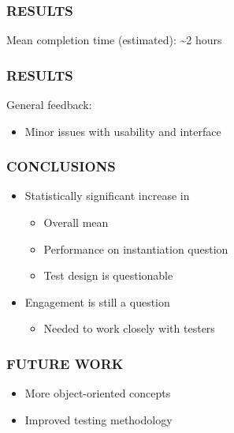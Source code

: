 \documentclass{beamer}
\let\theframetitle\frametitle
\renewcommand\frametitle[1]{\theframetitle{\MakeUppercase{#1}}}
\begin{document}
\begin{frame}
\frametitle{Results}

\begin{figure}
  \centering
\end{figure}

Mean completion time (estimated): \textasciitilde{}2 hours
\end{frame}

\begin{frame}
\frametitle{Results}
General feedback:
\begin{itemize}
\item Minor issues with usability and interface
\end{itemize}
\end{frame}

\begin{frame}
\frametitle{Conclusions}
\begin{itemize}
\item Statistically significant increase in
  \begin{itemize}
  \item Overall mean
  \item Performance on instantiation question
  \item Test design is questionable
  \end{itemize}
\item Engagement is still a question
  \begin{itemize}
  \item Needed to work closely with testers
  \end{itemize}
\end{itemize}
\end{frame}

\begin{frame}
\frametitle{Future Work}
\begin{itemize}
\item More object-oriented concepts
\item Improved testing methodology
\end{itemize}

\end{frame}
\end{document}

